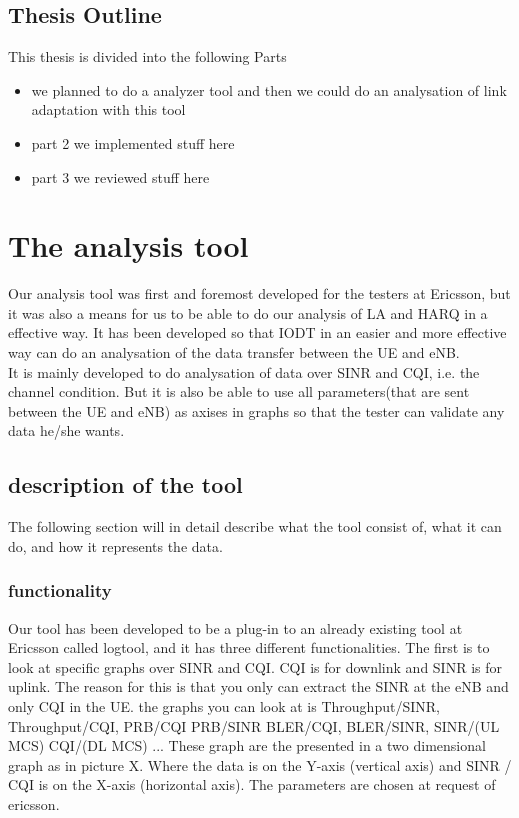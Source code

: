 \documentclass[cropmarks, frame, english]{idamasterthesis}
\begin{document}
\section{Thesis Outline}
This thesis is divided into the following Parts
\begin{itemize}
	\item we planned to do a analyzer tool and then we could do an analysation of link adaptation with this tool
	\item part 2 we implemented stuff here
	\item part 3 we reviewed stuff here
\end{itemize}

\chapter{The analysis tool}
Our analysis tool was first and foremost developed for the testers at Ericsson, but it was also a means for us to be able to do our analysis of LA and HARQ in a effective way. It has been developed so that IODT in an easier and more effective way can do an analysation of the data transfer between the UE and eNB. \\
It is mainly developed to do analysation of data over SINR and CQI, i.e. the channel condition. But it is also be able to use all parameters(that are sent between the UE and eNB) as axises in graphs so that the tester can validate any data he/she wants.
 
\section{description of the tool}
The following section will in detail describe what the tool consist of, what it can do, and how it represents the data.

\subsection{functionality}
Our tool has been developed to be a plug-in to an already existing tool at Ericsson called logtool, and it has three different functionalities. The first is to look at specific graphs over SINR and CQI. CQI is for downlink and SINR is for uplink. The reason for this is that you only can extract the SINR at the eNB and only CQI in the UE. the graphs you can look at is Throughput/SINR, Throughput/CQI, PRB/CQI PRB/SINR BLER/CQI, BLER/SINR, SINR/(UL MCS) CQI/(DL MCS) ... These graph are the presented in a two dimensional graph as in picture X. Where the data is on the Y-axis (vertical axis) and SINR / CQI is on the X-axis (horizontal axis). The parameters are chosen at request of ericsson. 
\end{document}
